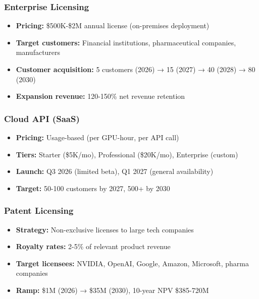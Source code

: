 \documentclass[11pt,letterpaper]{article}
\begin{document}
\subsubsection{Enterprise Licensing}

\begin{itemize}
    \item \textbf{Pricing:} \$500K-\$2M annual license (on-premises deployment)
    \item \textbf{Target customers:} Financial institutions, pharmaceutical companies, manufacturers
    \item \textbf{Customer acquisition:} 5 customers (2026) → 15 (2027) → 40 (2028) → 80 (2030)
    \item \textbf{Expansion revenue:} 120-150\% net revenue retention
\end{itemize}

\subsubsection{Cloud API (SaaS)}

\begin{itemize}
    \item \textbf{Pricing:} Usage-based (per GPU-hour, per API call)
    \item \textbf{Tiers:} Starter (\$5K/mo), Professional (\$20K/mo), Enterprise (custom)
    \item \textbf{Launch:} Q3 2026 (limited beta), Q1 2027 (general availability)
    \item \textbf{Target:} 50-100 customers by 2027, 500+ by 2030
\end{itemize}

\subsubsection{Patent Licensing}

\begin{itemize}
    \item \textbf{Strategy:} Non-exclusive licenses to large tech companies
    \item \textbf{Royalty rates:} 2-5\% of relevant product revenue
    \item \textbf{Target licensees:} NVIDIA, OpenAI, Google, Amazon, Microsoft, pharma companies
    \item \textbf{Ramp:} \$1M (2026) → \$35M (2030), 10-year NPV \$385-720M
\end{itemize}
\end{document}
